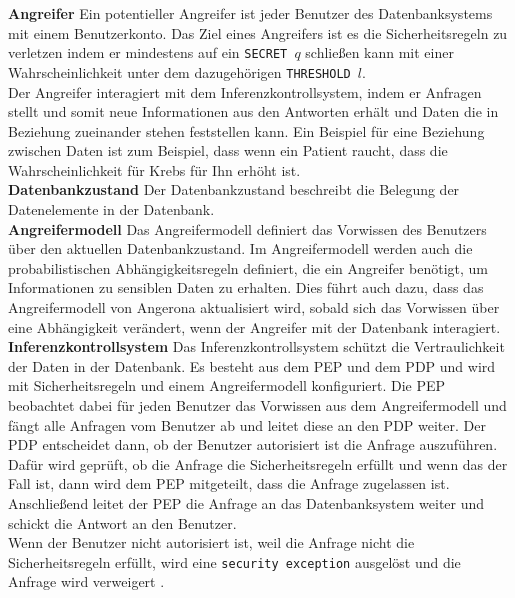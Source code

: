 \documentclass[german,version-2020-11]{uzl-thesis}
\begin{document}
\textbf{Angreifer} Ein potentieller Angreifer ist jeder Benutzer des Datenbanksystems mit einem Benutzerkonto. Das Ziel eines Angreifers ist es die Sicherheitsregeln zu verletzen indem er mindestens auf ein \texttt{SECRET $q$} schließen kann mit einer Wahrscheinlichkeit unter dem dazugehörigen \texttt{THRESHOLD $l$}. \\ Der Angreifer interagiert mit dem Inferenzkontrollsystem, indem er Anfragen stellt und somit neue Informationen aus den Antworten erhält und Daten die in Beziehung zueinander stehen feststellen kann. Ein Beispiel für eine Beziehung zwischen Daten ist zum Beispiel, dass wenn ein Patient raucht, dass die Wahrscheinlichkeit für Krebs für Ihn erhöht ist.  \\
\textbf{Datenbankzustand} Der Datenbankzustand beschreibt die Belegung der Datenelemente in der Datenbank. \\
\textbf{Angreifermodell} Das Angreifermodell definiert das Vorwissen des Benutzers über den aktuellen Datenbankzustand. Im Angreifermodell werden auch die probabilistischen Abhängigkeitsregeln definiert, die ein Angreifer benötigt, um Informationen zu sensiblen Daten zu erhalten. Dies führt auch dazu, dass das Angreifermodell von Angerona aktualisiert wird, sobald sich das Vorwissen über eine Abhängigkeit verändert, wenn der Angreifer mit der Datenbank interagiert.\\ 
\textbf{Inferenzkontrollsystem} Das Inferenzkontrollsystem schützt die Vertraulichkeit der Daten in der Datenbank. Es besteht aus dem PEP und dem PDP und wird mit Sicherheitsregeln und einem Angreifermodell konfiguriert. Die PEP beobachtet dabei für jeden Benutzer das Vorwissen aus dem Angreifermodell und fängt alle Anfragen vom Benutzer ab und leitet diese an den PDP weiter. Der PDP entscheidet dann, ob der Benutzer autorisiert ist die Anfrage auszuführen. Dafür wird geprüft, ob die Anfrage die Sicherheitsregeln erfüllt und wenn das der Fall ist, dann wird dem PEP mitgeteilt, dass die Anfrage zugelassen ist. Anschließend leitet der PEP die Anfrage an das Datenbanksystem weiter und schickt die Antwort an den Benutzer. \\  Wenn der Benutzer nicht autorisiert ist, weil die Anfrage nicht die Sicherheitsregeln erfüllt, wird eine \texttt{security exception} ausgelöst und die Anfrage wird verweigert \cite{6}.
\end{document}
